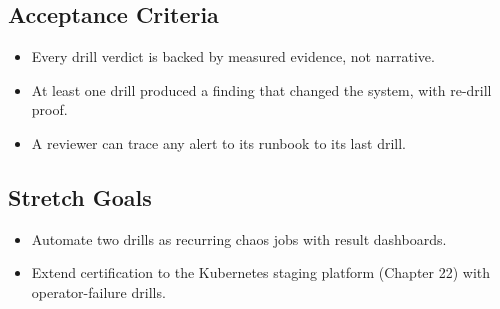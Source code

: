 \subsection*{Acceptance Criteria}
\begin{itemize}
    \item Every drill verdict is backed by measured evidence, not narrative.
    \item At least one drill produced a finding that changed the system, with re-drill proof.
    \item A reviewer can trace any alert to its runbook to its last drill.
\end{itemize}

\subsection*{Stretch Goals}
\begin{itemize}
    \item Automate two drills as recurring chaos jobs with result dashboards.
    \item Extend certification to the Kubernetes staging platform (Chapter 22) with operator-failure drills.
\end{itemize}